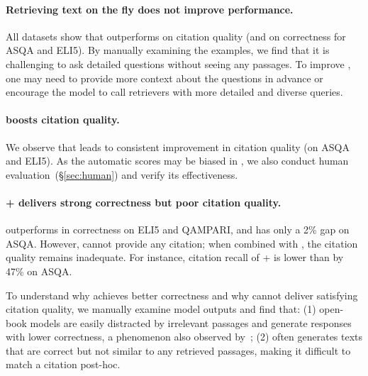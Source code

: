 \paragraph{Retrieving text on the fly does not improve performance.}
All datasets show that 
\vani{} 
 outperforms
\search{} on citation quality (and on correctness for ASQA and ELI5).
By manually examining the examples,
we find that 
it is challenging to ask detailed questions without seeing any passages.
To improve \search{},
one may need to provide more context about the questions in advance or
encourage the model to call retrievers with more detailed and diverse queries.

\paragraph{{\textsc{\prerank{}}} boosts citation quality.}
We observe that \rerank{} 
leads to consistent improvement in citation quality (on ASQA and ELI5).
As the automatic scores may be biased in \rerank{},
we also conduct human evaluation~(\S\ref{sec:human})
and verify its effectiveness. %

\paragraph{\textsc{\pclose{}}+\textsc{\pposthoc{}} delivers strong correctness but poor citation quality.}
\close{} outperforms \vani{} in correctness on ELI5 and QAMPARI, and has only a 2\% gap on ASQA.
However, 
\close{} cannot provide any citation;
when combined with \posthoc{},
the citation quality remains inadequate. For instance, 
citation recall of \close{}+\posthoc{} is lower than \vani{} by 47\% on ASQA. 

To understand why \close{} achieves better correctness and why \posthoc{} cannot deliver satisfying citation quality,
we manually examine model outputs and find that:
(1) open-book models are easily distracted by irrelevant passages and generate responses with lower correctness, 
a phenomenon also observed by~\citet{shi2023large};
(2) \close{} often generates texts that are correct but not similar to any retrieved passages, 
making it difficult to match a citation post-hoc.


